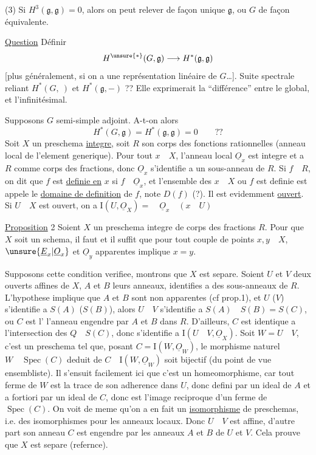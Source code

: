 
(3) Si $H^3(\mathfrak g,\mathfrak g)=0$, alors on peut relever de façon  unique $\mathfrak g$, ou $G$ de façon équivalente.

\uline{Question} Définir
\[
H^{\unsure{*}}(G,\mathfrak g)\longrightarrow H^*(\mathfrak g,\mathfrak g)
\]
[plus généralement, si on a une représentation linéaire de $G$\ldots]. Suite spectrale reliant $H^*(G,\ )$ et $H^*(\mathfrak g,-)$ ?? Elle exprimerait la ``différence'' entre le global, et l'infinitésimal.

Supposons $G$ semi-simple adjoint. A-t-on alors
\[
H^*(G,\mathfrak g)=H^*(\mathfrak g,\mathfrak g)=0\qquad??
\]
Soit $X$ un preschema \uline{integre}, soit $R$ son corps des fonctions rationnelles (anneau local de l'element generique). Pour tout $x\quad X$,  l'anneau local $\underline O_x$ est integre et a $R$ comme corps des fractions, donc $\underline O_x$ s'identifie a un sous-anneau de $R$. Si $f\quad R$, on dit que $f$ est \uline{definie en} $x$ si $f\quad\underline O_x$, et l'ensemble des $x\quad X$ ou $f$ est definie est appele le \uline{domaine de definition} de $f$, note $D(f)$ (?). Il est evidemment \uline{ouvert}. Si $U\quad X$ est ouvert, on a $\mathrm I(U,\underline O_X)=\quad\underline O_x\quad(x\quad U)$

\uline{Proposition} 2 Soient $X$ un preschema integre de corps des fractions $R$. Pour que $X$ soit un schema, il faut et il suffit que pour tout couple de points $x,y\quad X$, $\unsure{\underline E_x|\underline O_x}$ et $\underline O_y$ apparentes implique $x=y$.

Supposons cette condition verifiee, montrons que $X$ est separe. Soient $U$ et $V$ deux ouverts affines de $X$, $A$ et $B$ leurs anneaux, identifies a des sous-anneaux de $R$. L'hypothese implique que $A$ et $B$ sont non apparentes (cf prop.1),  et $U$ ($V$) s'identifie a $S(A)$ ($S(B)$), alors $U\quad V$ s'identifie a $S(A)\quad S(B)=S(C)$, ou $C$ est l' l'anneau engendre par $A$ et $B$ dans $R$. D'ailleurs, $C$ est identique a l'intersection des $Q\quad S(C)$, donc s'identifie a $\mathrm I(U\quad V,\underline O_X)$. Soit $W=U\quad V$, c'est un preschema tel que, posant $C=\mathrm I(W,\underline O_W)$, le morphisme naturel $W\quad\operatorname{Spec}(C)$ deduit de $C\quad\mathrm I(W,\underline O_W)$ soit bijectif (du point de vue ensembliste). Il s'ensuit facilement ici que c'est un homeomorphisme, car tout ferme de $W$ est la trace de son adherence dans $U$, donc defini par un ideal de $A$ et a fortiori par un ideal de  $C$, donc est l'image reciproque d'un ferme de $\operatorname{Spec}(C)$. On voit de meme qu'on a en fait un \uline{isomorphisme} de preschemas, i.e. des isomorphismes pour les anneaux locaux. Donc $U\quad V$ est affine, d'autre part son anneau $C$ est engendre par les anneaux $A$ et $B$ de $U$ et $V$. Cela prouve que $X$ est separe (refernce).

